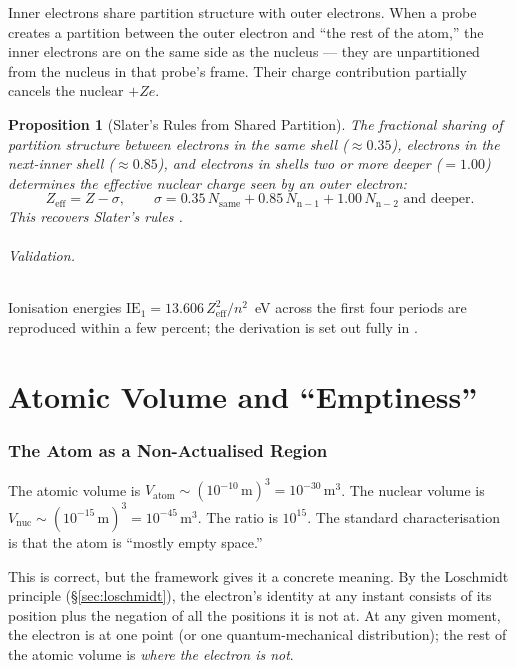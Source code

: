 \documentclass[11pt,a4paper]{article}
\newtheorem{proposition}[theorem]{Proposition}
\theoremstyle{definition}
\theoremstyle{remark}
\begin{document}
Inner electrons share partition structure with outer electrons. When a probe creates a partition between the outer electron and ``the rest of the atom,'' the inner electrons are on the same side as the nucleus --- they are unpartitioned from the nucleus in that probe's frame. Their charge contribution partially cancels the nuclear $+Ze$.

\begin{proposition}[Slater's Rules from Shared Partition]
\label{prop:slater}
The fractional sharing of partition structure between electrons in the same shell ($\approx 0.35$), electrons in the next-inner shell ($\approx 0.85$), and electrons in shells two or more deeper ($=1.00$) determines the effective nuclear charge seen by an outer electron:
\[
Z_\mathrm{eff} = Z - \sigma,\qquad \sigma = 0.35\,N_{\mathrm{same}} + 0.85\,N_{\mathrm{n-1}} + 1.00\,N_{\mathrm{n-2}}\text{ and deeper}.
\]
This recovers Slater's rules \citep{slater1930}.
\end{proposition}

\paragraph{Validation.} Ionisation energies $\mathrm{IE}_1 = 13.606\,Z_\mathrm{eff}^2 / n^2$~eV across the first four periods are reproduced within a few percent; the derivation is set out fully in \citep{sachikonye2025b}.

\part{Atomic Volume and ``Emptiness''}

\section{The Atom as a Non-Actualised Region}
\label{sec:empty}

The atomic volume is $V_{\mathrm{atom}} \sim (10^{-10}\,\mathrm{m})^3 = 10^{-30}\,\mathrm{m}^3$. The nuclear volume is $V_{\mathrm{nuc}} \sim (10^{-15}\,\mathrm{m})^3 = 10^{-45}\,\mathrm{m}^3$. The ratio is $10^{15}$. The standard characterisation is that the atom is ``mostly empty space.''

This is correct, but the framework gives it a concrete meaning. By the Loschmidt principle (\S\ref{sec:loschmidt}), the electron's identity at any instant consists of its position plus the negation of all the positions it is not at. At any given moment, the electron is at one point (or one quantum-mechanical distribution); the rest of the atomic volume is \emph{where the electron is not}.
\end{document}
